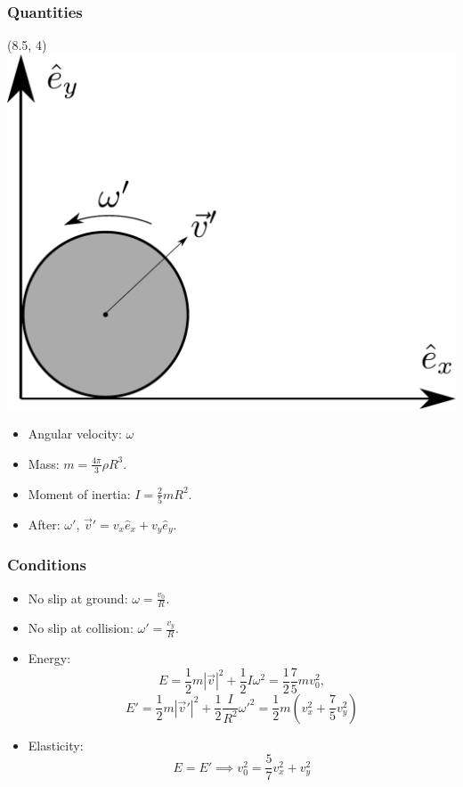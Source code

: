 \documentclass[aspectratio=169]{beamer}
\begin{document}
    \begin{frame}
        \frametitle{Quantities}
        \begin{textblock}{6}(8.5, 4)
            \includegraphics[width=\textwidth]{ball_collision.pdf}
        \end{textblock}
        \begin{itemize}
            \item Angular velocity: $\omega$
            \item Mass: $m = \frac{4 \pi}{3} \rho R^3$.
            \item Moment of inertia: $I = \frac{2}{5} m R^2$.
            \item After: $\omega'$, $\vec v' = v_x \hat e_x + v_y \hat e_y$.
        \end{itemize}
    \end{frame}


    \begin{frame}
        \frametitle{Conditions}
        \begin{itemize}
            \item No slip at ground: $\omega = \frac{v_0}{R}$.
            \item No slip at collision: $\omega' = \frac{v_y}{R}$.
            \item Energy:
            $$
            E = \frac{1}{2} m |\vec v|^2 + \frac{1}{2} I \omega^2
            = \frac{1}{2} \frac{7}{5} m v_0^2,
            $$
            $$
            E' = \frac{1}{2} m |\vec v'|^2 + \frac{1}{2} \frac{I}{R^2} \omega'^2
            = \frac{1}{2}m \left( v_x^2 + \frac{7}{5} v_y^2 \right) 
            $$
            \item Elasticity: 
            $$
                E = E' \implies
                v_0^2 = \frac{5}{7}v_x^2 + v_y^2
            $$
        \end{itemize}
    \end{frame}
\end{document}
